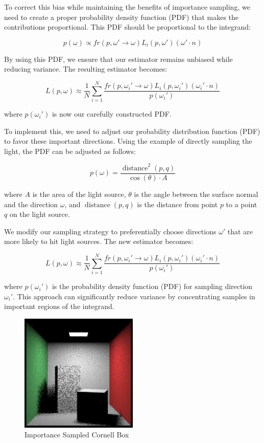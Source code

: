 \documentclass[12pt]{article}
\begin{document}
To correct this bias while maintaining the benefits of importance sampling, we need to create a proper probability density function (PDF) that makes the contributions proportional. This PDF should be proportional to the integrand:

\[
    p(\omega) \propto fr(p, \omega' \to \omega) L_i(p, \omega') (\omega' \cdot n)
\]

By using this PDF, we ensure that our estimator remains unbiased while reducing variance. The resulting estimator becomes:

\[
    L(p, \omega) \approx \frac{1}{N} \sum_{i=1}^N \frac{fr(p, \omega_i' \to \omega) L_i(p, \omega_i') (\omega_i' \cdot n)}{p(\omega_i')}
\]

where \( p(\omega_i') \) is now our carefully constructed PDF.

To implement this, we need to adjust our probability distribution function (PDF) to favor these important directions. Using the example of directly sampling the light, the PDF can be adjusted as follows:

\[
    p(\omega) = \frac{\operatorname{distance}^2(p,q)}{\cos(\theta) \cdot A}
\]

where \( A \) is the area of the light source, \( \theta \) is the angle between the surface normal and the direction \( \omega \), and \(\operatorname{distance}(p,q)\) is the distance from point \( p \) to a point \( q \) on the light source.

We modify our sampling strategy to preferentially choose directions \( \omega' \) that are more likely to hit light sources. The new estimator becomes:

\[
    L(p, \omega) \approx \frac{1}{N} \sum_{i=1}^N \frac{fr(p, \omega_i' \to \omega) L_i(p, \omega_i') (\omega_i' \cdot n)}{p(\omega_i')}
\]

where \( p(\omega_i') \) is the probability density function (PDF) for sampling direction \( \omega_i' \). This approach can significantly reduce variance by concentrating samples in important regions of the integrand.

\begin{figure}[H]
    \centering
    \includegraphics[width=0.5\textwidth]{images/one_samp/towards_light_pdf.png}
    \caption{Importance Sampled Cornell Box}
    \label{fig:importancesampled}
\end{figure}
\end{document}

